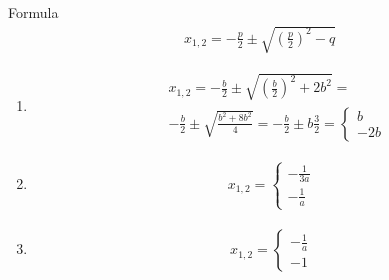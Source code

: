 {\color{solution}
Formula
\begin{align*}
x_{1,2} = -\frac{p}{2} \pm \sqrt{\left(\frac{p}{2}\right)^2 - q}
\end{align*}
\begin{enumerate}
	\item \begin{align*}
	&x_{1,2} = -\frac{b}{2} \pm \sqrt{\left(\frac{b}{2}\right)^2 + 2b^2} =\\
	&-\frac{b}{2} \pm \sqrt{ \frac{b^2 + 8b^2}{4}} = -\frac{b}{2} \pm  b\frac{3}{2} = 
	\begin{cases}
	b\\
	-2b
	\end{cases}
	\end{align*}
%	
	\item \begin{align*}
	x_{1,2} = \begin{cases}
	-\frac{1}{3a}\\
	-\frac{1}{a}
	\end{cases}
	\end{align*}
%	
	\item \begin{align*}
	x_{1,2} = \begin{cases}
	-\frac{1}{a}\\
	-1
	\end{cases}
	\end{align*}
\end{enumerate}
}